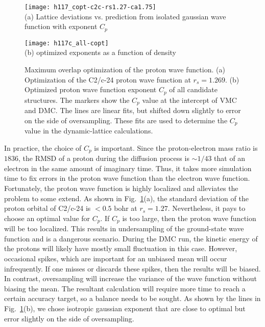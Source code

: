 \begin{figure}[h]
\centering
\begin{minipage}{0.49\textwidth}
\centering
\texttt{[image: h117\_copt-c2c-rs1.27-ca1.75]}\\
(a) Lattice deviations vs. prediction from isolated gaussian wave function with exponent $C_p$
\end{minipage}
\begin{minipage}{0.49\textwidth}
\centering
\texttt{[image: h117c\_all-copt]}\\
(b) optimized exponents as a function of density
\end{minipage}
\caption{Maximum overlap optimization of the proton wave function. (a) Optimization of the C2/c-24 proton wave function at $r_s=1.269$. (b) Optimized proton wave function exponent $C_p$ of all candidate structures. The markers show the $C_p$ value at the intercept of VMC and DMC. The lines are linear fits, but shifted down slightly to error on the side of oversampling. These fits are used to determine the $C_p$ value in the dynamic-lattice calculations.}
\label{fig:hsolid-cp-opt}
\end{figure}

In practice, the choice of $C_p$ is important.
Since the proton-electron mass ratio is $1836$, the RMSD of a proton during the diffusion process is $\sim 1/43$ that of an electron in the same amount of imaginary time.
Thus, it takes more simulation time to fix errors in the proton wave function than the electron wave function.
Fortunately, the proton wave function is highly localized and alleviates the problem to some extend.
As shown in Fig.~\ref{fig:hsolid-cp-opt}(a), the standard deviation of the proton orbital of C2/c-24 is $<0.5$ bohr at $r_s=1.27$.
Nevertheless, it pays to choose an optimal value for $C_p$.
If $C_p$ is too large, then the proton wave function will be too localized.
This results in undersampling of the ground-state wave function and is a dangerous scenario.
During the DMC run, the kinetic energy of the protons will likely have mostly small fluctuation in this case.
However, occasional spikes, which are important for an unbiased mean will occur infrequently.
If one misses or discards these spikes, then the results will be biased.
In contrast, oversampling will increase the variance of the wave function without biasing the mean.
The resultant calculation will require more time to reach a certain accuracy target, so a balance needs to be sought.
As shown by the lines in Fig.~\ref{fig:hsolid-cp-opt}(b), we chose isotropic gaussian exponent that are close to optimal but error slightly on the side of oversampling.

